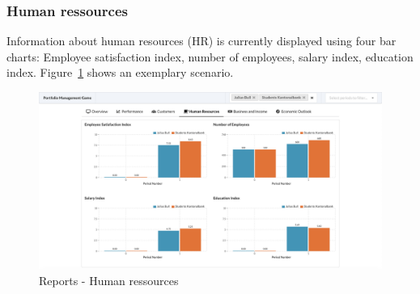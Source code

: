 \subsubsection{Human ressources}
Information about human resources (HR) is currently displayed using four bar charts: Employee satisfaction index, number of employees, salary index, education index. Figure~\ref{fig:reports_hr} shows an exemplary scenario.
\begin{figure}[h!]
  \centering
  \includegraphics[scale=0.2]{img/application-overview/reports/04_hr.png}
  \caption{Reports - Human ressources}
  \label{fig:reports_hr}
\end{figure}

